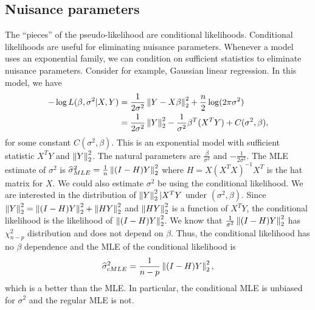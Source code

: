 \subsection{Nuisance parameters}
The ``pieces'' of the pseudo-likelihood are conditional likelihoods. Conditional likelihoods are useful for eliminating nuisance parameters. Whenever a model uses an exponential family, we can condition on sufficient statistics to eliminate nuisance parameters. Consider for example, Gaussian linear regression. In this model, we have 
\begin{align*}-\log L(\beta, \sigma^2|X,Y)& = \frac{1}{2\sigma^2}\left\|Y-X\beta\right\|_2^2+\frac{n}{2}\log(2\pi\sigma^2)\\
    &= \frac{1}{2\sigma^2}\left\|Y\right\|_2^2 - \frac{1}{\sigma^2}\beta^T(X^TY) + C(\sigma^2,\beta),\end{align*}
for some constant $C(\sigma^2,\beta)$. This is an exponential model with sufficient statistic $X^TY$ and $\left\|Y\right\|_2^2$. The natural parameters are $\frac{\beta}{\sigma^2}$ and $-\frac{1}{2\sigma^2}$. The MLE estimate of $\sigma^2$ is $\widehat{\sigma}^2_{MLE}=\frac{1}{n}\left\|(I-H)Y\right\|_2^2$ where $H=X(X^TX)^{-1}X^T$ is the hat matrix for $X$. We could also estimate $\sigma^2$ be using the conditional likelihood. We are interested in the distribution of $\left\|Y\right\|_2^2|X^T Y$ under $(\sigma^2,\beta)$. Since $\left\|Y\right\|_2^2=\left\|(I-H)Y\right\|_2^2 + \left\|HY\right\|_2^2$ and $\left\|HY\right\|_2^2$ is a function of $X^TY$, the conditional likelihood is the likelihood of $\left\|(I-H)Y\right\|_2^2$. We know that $\frac{1}{\sigma^2}\left\|(I-H)Y\right\|_2^2$ has $\chi^2_{n-p}$ distribution and does not depend on $\beta$. Thus, the conditional likelihood has no $\beta$ dependence and the MLE of the conditional likelihood is 
\[\widehat{\sigma}^2_{cMLE} = \frac{1}{n-p}\left\|(I-H)Y\right\|_2^2, \]
which is a better than the MLE. In particular, the conditional MLE is unbiased for $\sigma^2$ and the regular MLE is not. 
